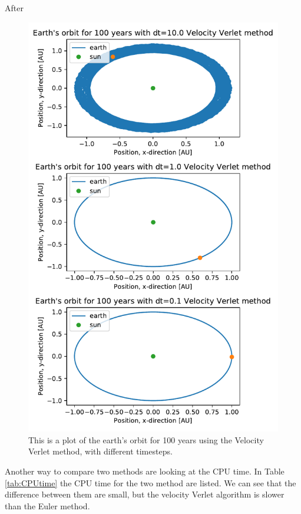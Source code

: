 After 
\begin{figure}[H]
	\includegraphics[width=0.9\linewidth]{../results/plots/different_timesteps_Velocity_Verlet_method.pdf}\caption{This is a plot of the earth's orbit for 100 years using the Velocity Verlet method, with different timesteps.}\label{fig:timesteps-verlet}
\end{figure}		

Another way to compare two methods are looking at the CPU time. In Table \ref{tab:CPUtime} the CPU time for the two method are listed. We can see that the difference between them are small, but the velocity Verlet algorithm is slower than the Euler method. 


